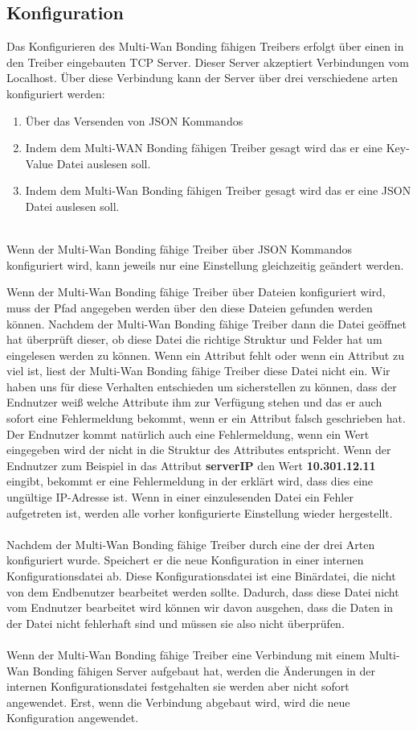 \subsection{Konfiguration}
Das Konfigurieren des Multi-Wan Bonding fähigen Treibers erfolgt über einen in den Treiber eingebauten TCP Server. Dieser Server akzeptiert Verbindungen vom Localhost. Über diese Verbindung kann der Server über drei verschiedene arten konfiguriert werden:
\\
\begin{enumerate}
    \item Über das Versenden von JSON Kommandos
    \item Indem dem Multi-WAN Bonding fähigen Treiber gesagt wird das er eine Key-Value Datei auslesen soll.
    \item Indem dem Multi-Wan Bonding fähigen Treiber gesagt wird das er eine JSON Datei auslesen soll.
\end{enumerate}
\ \\
Wenn der Multi-Wan Bonding fähige Treiber über JSON Kommandos konfiguriert wird, kann jeweils nur eine Einstellung gleichzeitig geändert werden.

\newpage

Wenn der Multi-Wan Bonding fähige Treiber über Dateien konfiguriert wird, muss der Pfad angegeben werden über den diese Dateien gefunden werden können. Nachdem der Multi-Wan Bonding fähige Treiber dann die Datei geöffnet hat überprüft dieser, ob diese Datei die richtige Struktur und Felder hat um eingelesen werden zu können. Wenn ein Attribut fehlt oder wenn ein Attribut zu viel ist, liest der Multi-Wan Bonding fähige Treiber diese Datei nicht ein. Wir haben uns für diese Verhalten entschieden um sicherstellen zu können, dass der Endnutzer weiß welche Attribute ihm zur Verfügung stehen und das er auch sofort eine Fehlermeldung bekommt, wenn er ein Attribut falsch geschrieben hat. Der Endnutzer kommt natürlich auch eine Fehlermeldung, wenn ein Wert eingegeben wird der nicht in die Struktur des Attributes entspricht. Wenn der Endnutzer zum Beispiel in das Attribut \textbf{serverIP} den Wert \textbf{10.301.12.11} eingibt, bekommt er eine Fehlermeldung in der erklärt wird, dass dies eine ungültige IP-Adresse ist. Wenn in einer einzulesenden Datei ein Fehler aufgetreten ist, werden alle vorher konfigurierte Einstellung wieder hergestellt. 
\\\\
Nachdem der Multi-Wan Bonding fähige Treiber durch eine der drei Arten konfiguriert wurde. Speichert er die neue Konfiguration in einer internen Konfigurationsdatei ab. Diese Konfigurationsdatei ist eine Binärdatei, die nicht von dem Endbenutzer bearbeitet werden sollte. Dadurch, dass diese Datei nicht vom Endnutzer bearbeitet wird können wir davon ausgehen, dass die Daten in der Datei nicht fehlerhaft sind und müssen sie also nicht   überprüfen.
\\\\
Wenn der Multi-Wan Bonding fähige Treiber eine Verbindung mit einem Multi-Wan Bonding fähigen Server aufgebaut hat, werden die Änderungen in der internen Konfigurationsdatei festgehalten sie werden aber nicht sofort angewendet. Erst, wenn die Verbindung abgebaut wird, wird die neue Konfiguration angewendet.
